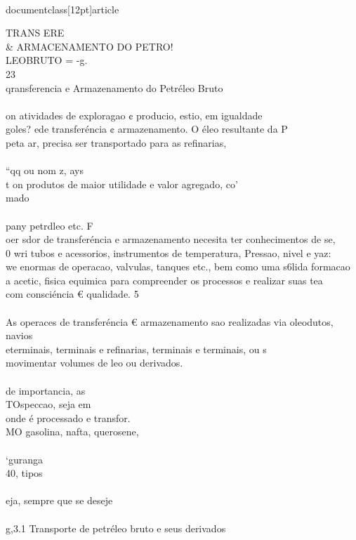\\documentclass[12pt]{article}
\begin{document}
TRANS ERE \\& ARMACENAMENTO DO PETRO!\\
LEOBRUTO = -g.\\
23\\
qransferencia e Armazenamento do Petréleo Bruto\\
\\
on atividades de exploragao ¢ producio, estio, em igualdade\\
goles? ede transferéncia ¢ armazenamento. O éleo resultante da P\\
peta ar, precisa ser transportado para as refinarias,\\
\\
“qq ou nom z, ays\\
t on produtos de maior utilidade e valor agregado, co’\\
mado\\
\\
pany petrdleo etc. F\\
oer sdor de transferéncia e armazenamento necesita ter conhecimentos de se,\\
0 wri tubos e acessorios, instrumentos de temperatura, Pressao, nivel e yaz:\\
we enormas de operacao, valvulas, tanques etc., bem como uma s6lida formacao\\
a acetic, fisica equimica para compreender os processos e realizar suas tea\\
com consciéncia € qualidade. 5\\
\\
As operaces de transferéncia € armazenamento sao realizadas via oleodutos, navios\\
eterminais, terminais e refinarias, terminais e terminais, ou s\\
movimentar volumes de leo ou derivados.\\
\\
de importancia, as\\
TOspeccao, seja em\\
onde é processado e transfor.\\
MO gasolina, nafta, querosene,\\
\\
‘guranga\\
40, tipos\\
\\
eja, sempre que se deseje\\
\\
g,3.1 Transporte de petréleo bruto e seus derivados\\
\end{document}

